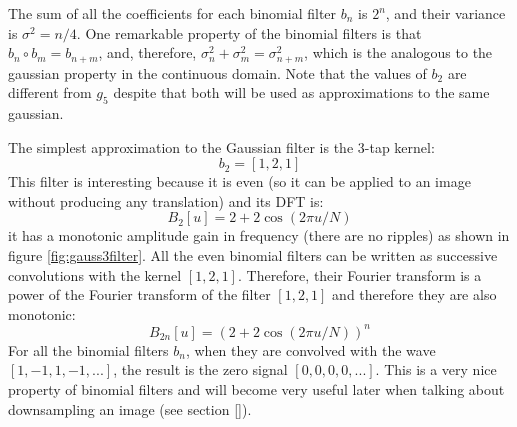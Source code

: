 The sum of all the coefficients for each binomial filter $b_n$ is $2^n$, and their variance is $\sigma^2 = n/4$. One remarkable property of the binomial filters is that $b_n \circ b_m = b_{n+m}$, and, therefore, $\sigma_n^2 + \sigma_m^2  = \sigma_{n+m}^2$, which is the analogous to the gaussian property in the continuous domain. Note that the values of $b_2$ are different from $g_5$ despite that both will be used as approximations to the same gaussian.

The simplest approximation to the Gaussian filter is the 3-tap kernel:
\begin{equation}
	b_2 = \left[1, 2, 1\right]
\end{equation}
This filter is interesting because it is even (so it can be applied to an image without producing any translation) and its DFT is:
\begin{equation}
	B_2 \left[u\right] = 2+2 \cos (2 \pi u/N)
\end{equation}
it has a monotonic amplitude gain in frequency (there are no ripples) as shown in figure \ref{fig:gauss3filter}.  All the even binomial filters can be written as successive convolutions with the kernel $\left[1,2,1\right]$. Therefore, their Fourier transform is a power of the Fourier transform of the filter $\left[1,2,1\right]$ and therefore they are also monotonic:
\begin{equation}
	B_{2n} \left[u\right] = (2+2 \cos (2 \pi u/N))^n
\end{equation}
For all the binomial filters $b_n$, when they are convolved with the wave $\left[1,-1,1,-1,...\right]$, the result is the zero signal $\left[0,0,0,0,...\right]$. This is a very nice property of binomial filters and will become very useful later when talking about downsampling an image (see section \ref{}).

